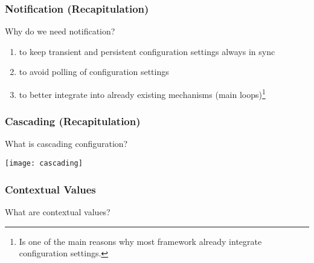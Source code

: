 \begin{frame}
	\frametitle{Notification (Recapitulation)}

	\begin{task}
	Why do we need notification?
	\end{task}

	\pause

	\begin{enumerate}
	\item to keep transient and persistent configuration settings always in sync~\cite{jin2014configurations}
	\item to avoid polling of configuration settings
	\item to better integrate into already existing mechanisms (main loops)\footnote{Is one of the main reasons why most framework already integrate configuration settings.}
	\end{enumerate}

\end{frame}

\begin{frame}
	\frametitle{Cascading (Recapitulation)}

	\begin{task}
	What is cascading configuration?
	\end{task}
	\vspace{1em}

	\pause

	\texttt{[image: cascading]}
\end{frame}

\begin{frame}
	\frametitle{Contextual Values}

	\begin{task}
	What are contextual values?
	\end{task}

	\pause

\end{frame}


